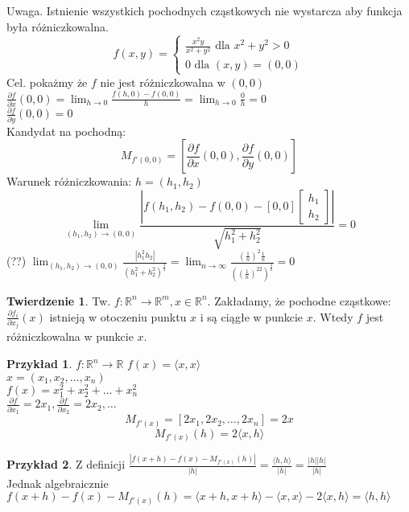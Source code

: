 \documentclass{article}
\theoremstyle{definition}
\theoremstyle{definition}
\newtheorem{tw}{Twierdzenie}[subsection]
\theoremstyle{definition}
\newtheorem{pk}{Przykład}[subsection]
\theoremstyle{definition}
\theoremstyle{definition}
\theoremstyle{definition}
\theoremstyle{definition}
\begin{document}
Uwaga. Istnienie wszystkich pochodnych cząstkowych nie wystarcza aby funkcja była różniczkowalna.
$$
f(x,y)=\begin{cases} 
    \frac{x^2y}{x^2+y^2} \text{ dla } x^2+y^2>0\\
    0 \text{ dla } (x,y)=(0,0) 
\end{cases}
$$
Cel. pokażmy że $f$ nie jest różniczkowalna w $(0,0)$\\
$\frac{\partial f}{\partial x} (0,0) = \lim_{h\rightarrow 0} \frac{f(h,0)-f(0,0)}{h} = \lim_{h\rightarrow 0} \frac{0}{h} = 0$\\
$\frac{\partial f}{\partial y} (0,0) = 0$\\
Kandydat na pochodną:
$$
M_{f'(0,0)} = \left[\frac{\partial f}{\partial x} (0,0),\frac{\partial f}{\partial y} (0,0)\right]
$$
Warunek różniczkowania: $h=(h_1,h_2)$\\
$$
\lim_{(h_1,h_2)\rightarrow(0,0)}
\frac{\left|f(h_1,h_2) - f(0,0) - [0,0]
    \left[\begin{matrix}
    h_1\\h_2\end{matrix}\right]
    \right|}{\sqrt{h_1^2 + h_2^2}} = 0
$$ (??)
$
\lim_{(h_1,h_2)\rightarrow (0,0)} \frac{|h_1^2 h_2|}{(h_1^2+h_2^2)^{\frac{3}{2}}}=
\lim_{n\rightarrow \infty} \frac{\left(\frac{1}{n}\right)^2\frac{1}{n}}{\left((\frac{1}{n})^22\right)^{\frac{3}{2}}}=0
$

\begin{tw}
    Tw. $f: \mathbb{R}^n \rightarrow \mathbb{R}^m, x\in\mathbb{R}^n$. Zakładamy, że pochodne cząstkowe: $\frac{\partial f_i}{\partial x_j} (x)$
    istnieją w otoczeniu punktu $x$ i są ciągłe w punkcie $x$. Wtedy $f$ jest różniczkowalna w punkcie $x$.
\end{tw}

\begin{pk}
    $f:\mathbb{R}^n \rightarrow \mathbb{R}$ $f(x)=\langle x, x \rangle$\\
    $x=(x_1,x_2,\dots,x_n)$\\
    $f(x)=x_1^2+x_2^2+\dots+x_n^2$\\
    $\frac{\partial f}{\partial x_1} = 2x_1, \frac{\partial f}{\partial x_2} = 2x_2, \dots$\\
    $$M_{f'(x)} = \left[2x_1, 2x_2, \dots, 2x_n\right]=2x$$
    $$M_{f'(x)}(h) = 2\langle x,h\rangle$$
\end{pk}

\begin{pk}
    Z definicji $\frac{\left|f(x+h)-f(x)-M_{f'(x)}(h) \right|}{|h|}=\frac{\langle h,h \rangle}{|h|} = \frac{|h||h|}{|h|}$\\
    Jednak algebraicznie $f(x+h)-f(x)-M_{f'(x)}(h)=\langle x+h,x+h \rangle - \langle x, x \rangle - 2 \langle x, h \rangle=\langle h,h \rangle$
\end{pk}
\end{document}
